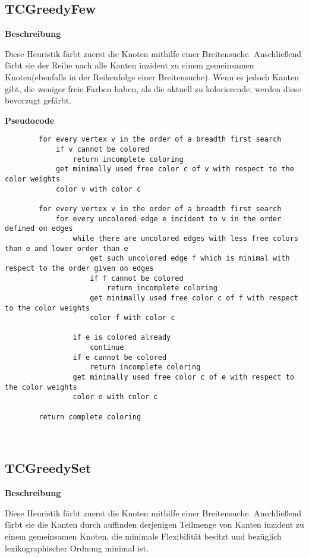 \documentclass{article}
\begin{document}
	\subsection{TCGreedyFew}
	
	\textbf{Beschreibung}
	
	Diese Heuristik färbt zuerst die Knoten mithilfe einer Breitensuche. Anschließend färbt sie der Reihe nach alle Kanten inzident zu einem gemeinsamen Knoten(ebenfalls in der Reihenfolge einer Breitensuche). Wenn es jedoch Kanten gibt, die weniger freie Farben haben, als die aktuell zu kolorierende, werden diese bevorzugt gefärbt.
	
	\textbf{Pseudocode}
	\begin{verbatim}
		for every vertex v in the order of a breadth first search
		    if v cannot be colored
		        return incomplete coloring
		    get minimally used free color c of v with respect to the color weights
		    color v with color c
				    
		for every vertex v in the order of a breadth first search
		    for every uncolored edge e incident to v in the order defined on edges
		        while there are uncolored edges with less free colors than e and lower order than e
		            get such uncolored edge f which is minimal with respect to the order given on edges
		            if f cannot be colored
		                return incomplete coloring
		            get minimally used free color c of f with respect to the color weights
		            color f with color c
		            
		        if e is colored already
		            continue
		        if e cannot be colored
		            return incomplete coloring
		        get minimally used free color c of e with respect to the color weights
		        color e with color c
				        
		return complete coloring
	\end{verbatim}
	
	~\newpage
	
	\subsection{TCGreedySet}
	
	\textbf{Beschreibung}
	
	Diese Heuristik färbt zuerst die Knoten mithilfe einer Breitensuche. Anschließend färbt sie die Kanten durch auffinden derjenigen Teilmenge von Kanten inzident zu einem gemeinsamen Knoten, die minimale Flexibilität besitzt und bezüglich lexikographischer Ordnung minimal ist.
	
\end{document}
